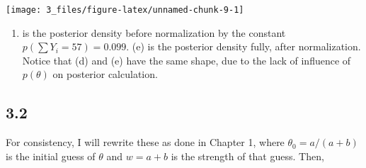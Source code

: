 \documentclass[]{article}
\providecommand{\tightlist}{%
  \setlength{\itemsep}{0pt}\setlength{\parskip}{0pt}}
\begin{document}
\begin{center}\texttt{[image: 3\_files/figure-latex/unnamed-chunk-9-1]} \end{center}

\begin{enumerate}
\def\labelenumi{(\alph{enumi})}
\setcounter{enumi}{3}
\tightlist
\item
  is the posterior density before normalization by the constant
  \(p(\sum Y_i = 57) = 0.099\). (e) is the posterior density fully,
  after normalization. Notice that (d) and (e) have the same shape, due
  to the lack of influence of \(p(\theta)\) on posterior calculation.
\end{enumerate}

\hypertarget{section-1}{%
\subsection{3.2}\label{section-1}}

For consistency, I will rewrite these as done in Chapter 1, where
\(\theta_0 = a / (a + b)\) is the initial guess of \(\theta\) and
\(w = a + b\) is the strength of that guess. Then,
\end{document}

